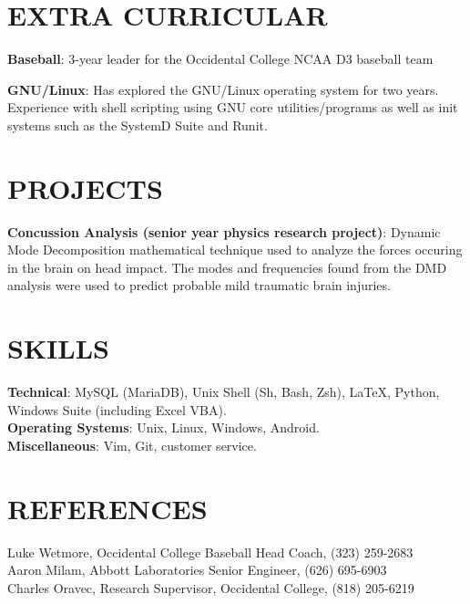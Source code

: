 \documentclass[margin]{res}
\begin{document}
\begin{resume}
\section{EXTRA CURRICULAR}
\par
\textbf{Baseball}: 3-year leader for the Occidental College NCAA D3 baseball team
\par
\textbf{GNU/Linux}: Has explored the GNU/Linux operating system for two years. Experience with shell scripting using GNU core utilities/programs as well as init systems such as the SystemD Suite and Runit.

\section{PROJECTS}
\par
\textbf{Concussion Analysis (senior year physics research project)}: 
Dynamic Mode Decomposition mathematical technique used to analyze the forces occuring in the brain on head impact. The modes and frequencies found from the DMD analysis were used to predict probable mild traumatic brain injuries.

\section{SKILLS}

\textbf{Technical}: MySQL (MariaDB), Unix Shell (Sh, Bash, Zsh), \LaTeX, Python, Windows Suite (including Excel VBA).
\\
\textbf{Operating Systems}: Unix, Linux, Windows, Android.
\\
\textbf{Miscellaneous}: Vim, Git, customer service.

\section{REFERENCES}
Luke Wetmore, Occidental College Baseball Head Coach, (323) 259-2683 \\
Aaron Milam, Abbott Laboratories Senior Engineer, (626) 695-6903 \\
Charles Oravec, Research Supervisor, Occidental College, (818) 205-6219
\end{resume}
\end{document}
